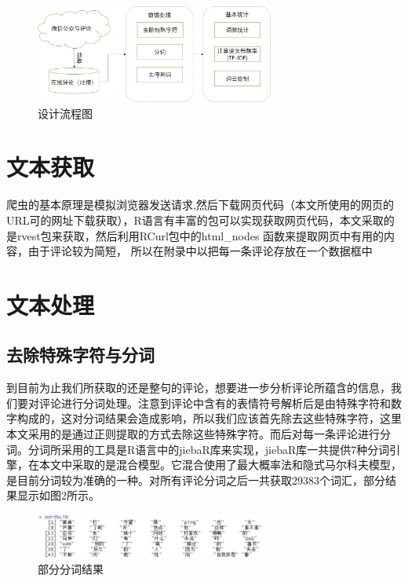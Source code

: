 \documentclass[a4paper,12pt]{ctexart}     %
\begin{document}
		\begin{figure}[H] %
			\centering %
			\includegraphics[width=0.7\textwidth]{流程图.png} %
			\caption{设计流程图} %
			\label{Fig.main 1} %
		\end{figure}




	\section{文本获取}
	
	爬虫的基本原理是模拟浏览器发送请求,然后下载网页代码（本文所使用的网页的URL可的网址下载获取），R语言有丰富的包可以实现获取网页代码，本文采取的是rvest包来获取，然后利用RCurl包中的html\_nodes 函数来提取网页中有用的内容，由于评论较为简短，
	所以在附录中以把每一条评论存放在一个数据框中
	
	\section{文本处理}
	
	\subsection{去除特殊字符与分词}
	
	到目前为止我们所获取的还是整句的评论，想要进一步分析评论所蕴含的信息，我们要对评论进行分词处理。注意到评论中含有的表情符号解析后是由特殊字符和数字构成的，这对分词结果会造成影响，所以我们应该首先除去这些特殊字符，这里本文采用的是通过正则提取的方式去除这些特殊字符。而后对每一条评论进行分词。分词所采用的工具是R语言中的jiebaR库来实现，jiebaR库一共提供7种分词引擎，在本文中采取的是混合模型。它混合使用了最大概率法和隐式马尔科夫模型，是目前分词较为准确的一种。对所有评论分词之后一共获取29383个词汇，部分结果显示如图2所示。
	
		\begin{figure}[H] %
			\centering %
			\includegraphics[width=0.7\textwidth]{分词结果.jpg} %
			\caption{部分分词结果} %
			\label{Fig.main 2} %
		\end{figure}
	
\end{document}
